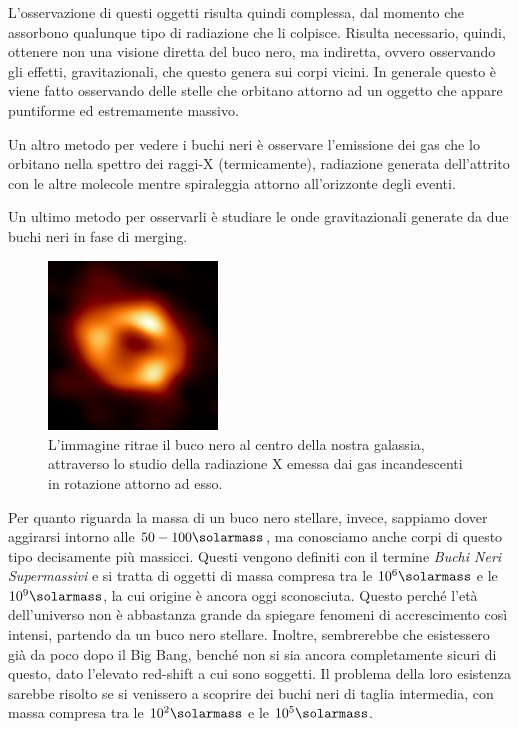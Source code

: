 L'osservazione di questi oggetti risulta quindi complessa, dal momento che assorbono qualunque tipo di radiazione che li colpisce. Risulta necessario, quindi, ottenere non una visione diretta del buco nero, ma indiretta, ovvero osservando gli effetti, gravitazionali, che questo genera sui corpi vicini. In generale questo è viene fatto osservando delle stelle che orbitano attorno ad un oggetto che appare puntiforme ed estremamente massivo.

Un altro metodo per vedere i buchi neri è osservare l'emissione dei gas che lo orbitano nella spettro dei raggi-X (termicamente), radiazione generata dell'attrito con le altre molecole mentre spiraleggia attorno all'orizzonte degli eventi.

Un ultimo metodo per osservarli è studiare le onde gravitazionali generate da due buchi neri in fase di merging.
\begin{figure}
    \centering
    \includegraphics[width=0.4\textwidth]{immagini/blackhole.png}
    \caption{L'immagine ritrae il buco nero al centro della nostra galassia, attraverso lo studio della radiazione X emessa dai gas incandescenti in rotazione attorno ad esso.}\label{fig:buco-nero}
\end{figure}

Per quanto riguarda la massa di un buco nero stellare, invece, sappiamo dover aggirarsi intorno alle $50 - 100\si{\solarmass}$, ma conosciamo anche corpi di questo tipo decisamente più massicci. Questi vengono definiti con il termine \textit{Buchi Neri Supermassivi} e si tratta di oggetti di massa compresa tra le $10^6 \si{\solarmass}$ e le $10^9 \si{\solarmass}$, la cui origine è ancora oggi sconosciuta. Questo perché l'età dell'universo non è abbastanza grande da spiegare fenomeni di accrescimento così intensi, partendo da un buco nero stellare. Inoltre, sembrerebbe che esistessero già da poco dopo il Big Bang, benché non si sia ancora completamente sicuri di questo, dato l'elevato red-shift a cui sono soggetti. Il problema della loro esistenza sarebbe risolto se si venissero a scoprire dei buchi neri di taglia intermedia, con massa compresa tra le $10^2 \si{\solarmass}$ e le $10^5 \si{\solarmass}$.